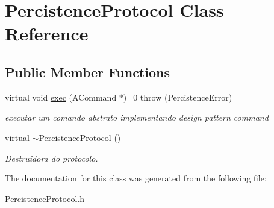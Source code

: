 \hypertarget{class_percistence_protocol}{\section{Percistence\-Protocol Class Reference}
\label{class_percistence_protocol}
}
\subsection*{Public Member Functions}
\begin{DoxyCompactItemize}
\item 
\hypertarget{class_percistence_protocol_aabb1342054dba836dfd026254dbffafb}{virtual void \hyperlink{class_percistence_protocol_aabb1342054dba836dfd026254dbffafb}{exec} (A\-Command $\ast$)=0  throw (\-Percistence\-Error)}\label{class_percistence_protocol_aabb1342054dba836dfd026254dbffafb}

\begin{DoxyCompactList}\small\item\em executar um comando abstrato implementando design pattern command \end{DoxyCompactList}\item 
\hypertarget{class_percistence_protocol_ad68bcb2a3e256694b59cafa2fcf43606}{virtual \hyperlink{class_percistence_protocol_ad68bcb2a3e256694b59cafa2fcf43606}{$\sim$\-Percistence\-Protocol} ()}\label{class_percistence_protocol_ad68bcb2a3e256694b59cafa2fcf43606}

\begin{DoxyCompactList}\small\item\em Destruidora do protocolo. \end{DoxyCompactList}\end{DoxyCompactItemize}


The documentation for this class was generated from the following file\-:\begin{DoxyCompactItemize}
\item 
\hyperlink{_percistence_protocol_8h}{Percistence\-Protocol.\-h}\end{DoxyCompactItemize}
